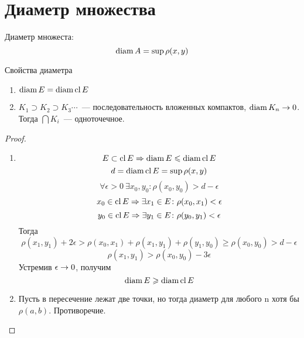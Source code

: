 \section{Диаметр множества}
\begin{Def}
Диаметр множеста:
$$\operatorname{diam} A = \sup \rho(x, y)$$
\end{Def}

\begin{theorem}{Свойства диаметра}
\begin{enumerate}
\item $\operatorname{diam} E = \operatorname{diam} \operatorname{cl} E$
\item $K_1 \supset K_2 \supset K_3 \cdots $~--- последовательность вложенных компактов, $\operatorname{diam} K_n \rightarrow 0$. Тогда $\bigcap K_i$~--- одноточечное.
\end{enumerate}
\end{theorem}
\begin{proof}
\begin{enumerate}
\item
$$E \subset \operatorname{cl} E \Rightarrow \operatorname{diam} E \leqslant \operatorname{diam} \operatorname{cl} E$$
$$d = \operatorname{diam} \operatorname{cl} E = \sup \rho(x, y)$$
$$\forall \epsilon > 0\: \exists x_0, y_0\colon \rho(x_0, y_0) > d - \epsilon$$
$$x_0 \in \operatorname{cl} E \Rightarrow \exists x_1 \in E\colon \rho (x_0, x_1) < \epsilon$$ 
$$y_0 \in \operatorname{cl} E \Rightarrow \exists y_1 \in E\colon \rho (y_0, y_1) < \epsilon$$ 
Тогда
$$\rho(x_1, y_1) + 2\epsilon > \rho(x_0, x_1) + \rho(x_1, y_1) + \rho(y_1, y_0) \geqslant \rho(x_0, y_0) > d - \epsilon$$
$$\rho(x_1, y_1) > \rho(x_0, y_0) - 3\epsilon$$
Устремив $\epsilon \rightarrow 0$, получим
$$\operatorname{diam} E \geqslant \operatorname{diam} \operatorname{cl} E$$
\item Пусть в пересечение лежат две точки, но тогда диаметр для любого n хотя бы $\rho(a, b)$. Противоречие.
\end{enumerate}
\end{proof}